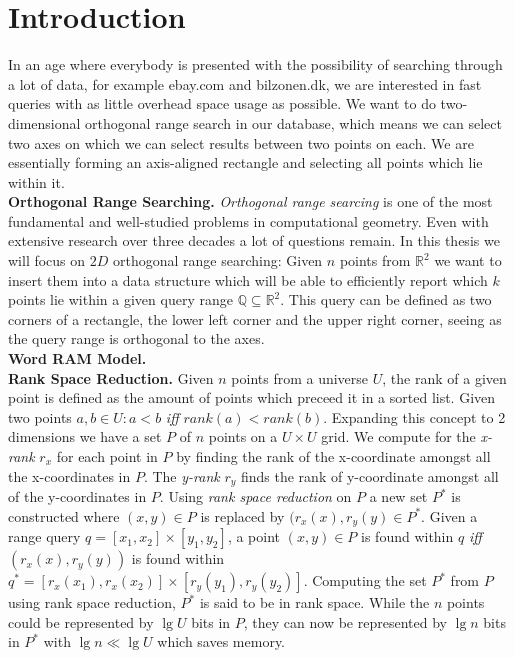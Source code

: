 \chapter{Introduction}
\label{ch:intro}
In an age where everybody is presented with the possibility of searching through a lot of data, for example ebay.com and bilzonen.dk, we are interested in fast queries with as little overhead space usage as possible. We want to do two-dimensional orthogonal range search in our database, which means we can select two axes on which we can select results between two points on each. We are essentially forming an axis-aligned rectangle and selecting all points which lie within it.  \\

\noindent \textbf{Orthogonal Range Searching.} \emph{Orthogonal range searcing} is one of the most fundamental and well-studied problems in computational geometry. Even with extensive research over three decades a lot of questions remain. In this thesis we will focus on $2D$ orthogonal range searching: Given $n$ points from $\mathbb{R}^2$ we want to insert them into a data structure which will be able to efficiently report which $k$ points lie within a given query range $\mathbb{Q} \subseteq \mathbb{R}^2$. This query can be defined as two corners of a rectangle, the lower left corner and the upper right corner, seeing as the query range is orthogonal to the axes. \\

\noindent \textbf{Word RAM Model.} \\

\noindent \textbf{Rank Space Reduction.} Given $n$ points from a universe $U$, the rank of a given point is defined as the amount of points which preceed it in a sorted list. Given two points $a,b \in U: a < b$ \emph{iff} $rank(a) < rank(b)$. Expanding this concept to 2 dimensions we have a set $P$ of $n$ points on a $U \times U$ grid. We compute for the \emph{x-rank} $r_x$ for each point in $P$ by finding the rank of the x-coordinate amongst all the x-coordinates in $P$. The \emph{y-rank} $r_y$ finds the rank of y-coordinate amongst all of the y-coordinates in $P$. Using \emph{rank space reduction} on $P$ a new set $P^*$ is constructed where $(x,y) \in P$ is replaced by $(r_x(x), r_y(y) \in P^*$. Given a range query $q = [x_1, x_2] \times [y_1, y_2]$, a point $(x,y) \in P$ is found within $q$ \emph{iff} $(r_x(x), r_y(y))$ is found within $q^* = [r_x(x_1), r_x(x_2)] \times [r_y(y_1), r_y(y_2)]$.  Computing the set $P^*$ from $P$ using rank space reduction, $P^*$ is said to be in rank space. While the $n$ points could be represented by $\lg U$ bits in $P$, they can now be represented by $\lg n$ bits in $P^*$ with $\lg n \ll \lg U$ which saves memory.  \\

